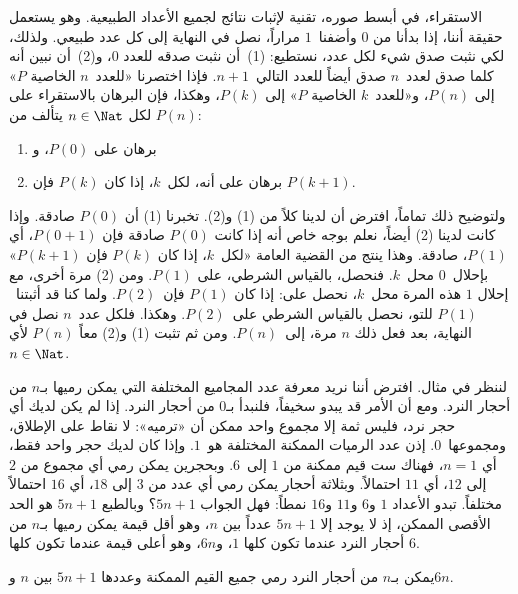 \documentclass[../../../include/open-logic-section]{subfiles}
\begin{document}


الاستقراء، في أبسط صوره، تقنية لإثبات نتائج لجميع الأعداد الطبيعية.
وهو يستعمل حقيقة أننا، إذا بدأنا من $0$ وأضفنا~$1$ مراراً، نصل في
النهاية إلى كل عدد طبيعي. ولذلك، لكي نثبت صدق شيء لكل عدد، نستطيع:
(1)~أن نثبت صدقه للعدد $0$، و(2)~أن نبين أنه كلما صدق لعدد~$n$ صدق
أيضاً للعدد التالي~$n+1$. فإذا اختصرنا «للعدد~$n$ الخاصية $P$» إلى
$P(n)$، و«للعدد~$k$ الخاصية $P$» إلى $P(k)$، وهكذا، فإن البرهان
بالاستقراء على $P(n)$ لكل $n \in \Nat$ يتألف من:
\begin{enumerate}
\item برهان على $P(0)$، و
\item برهان على أنه، لكل~$k$، إذا كان $P(k)$ فإن $P(k+1)$.
\end{enumerate}
ولتوضيح ذلك تماماً، افترض أن لدينا كلاً من (1) و(2). تخبرنا (1) أن
$P(0)$ صادقة. وإذا كانت لدينا (2) أيضاً، نعلم بوجه خاص أنه إذا كانت
$P(0)$ صادقة فإن $P(0+1)$، أي $P(1)$، صادقة. وهذا ينتج من القضية
العامة «لكل~$k$، إذا كان $P(k)$ فإن $P(k+1)$» بإحلال~$0$ محل~$k$.
فنحصل، بالقياس الشرطي، على $P(1)$. ومن (2) مرة أخرى، مع إحلال $1$ هذه
المرة محل~$k$، نحصل على: إذا كان $P(1)$ فإن~$P(2)$. ولما كنا قد
أثبتنا~$P(1)$ للتو، نحصل بالقياس الشرطي على~$P(2)$. وهكذا. فلكل
عدد~$n$ نصل في النهاية، بعد فعل ذلك $n$ مرة، إلى~$P(n)$. ومن ثم تثبت
(1) و(2) معاً $P(n)$ لأي $n \in \Nat$.

لننظر في مثال. افترض أننا نريد معرفة عدد المجاميع المختلفة التي يمكن
رميها بـ$n$ من أحجار النرد. ومع أن الأمر قد يبدو سخيفاً، فلنبدأ بـ$0$
من أحجار النرد. إذا لم يكن لديك أي حجر نرد، فليس ثمة إلا مجموع واحد
ممكن أن «ترميه»: لا نقاط على الإطلاق، ومجموعها~$0$. إذن عدد الرميات
الممكنة المختلفة هو~$1$. وإذا كان لديك حجر واحد فقط، أي $n=1$، فهناك
ست قيم ممكنة من $1$ إلى~$6$. وبحجرين يمكن رمي أي مجموع من $2$ إلى
$12$، أي $11$ احتمالاً. وبثلاثة أحجار يمكن رمي أي عدد من $3$ إلى
$18$، أي $16$ احتمالاً مختلفاً. تبدو الأعداد $1$ و$6$ و$11$ و$16$
نمطاً: فهل الجواب $5n+1$؟ وبالطبع $5n+1$ هو الحد الأقصى الممكن، إذ لا
يوجد إلا $5n+1$ عدداً بين $n$، وهو أقل قيمة يمكن رميها بـ$n$ من أحجار
النرد عندما تكون كلها $1$، و$6n$، وهو أعلى قيمة عندما تكون كلها $6$.

\begin{thm}
  يمكن بـ$n$ من أحجار النرد رمي جميع القيم الممكنة وعددها $5n+1$ بين
  $n$ و$6n$.
\end{thm}
\end{document}
